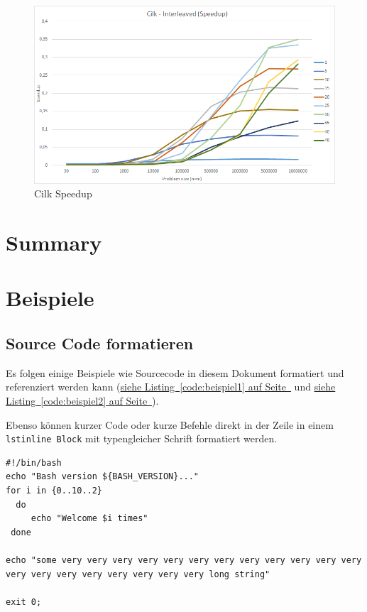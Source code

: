 \documentclass[12pt,a4paper,titlepage,oneside]{scrartcl}
\begin{document}
\begin{figure}[h]
\includegraphics[width=\linewidth]{Saturn_Cilk_Speedup}
\caption{Cilk Speedup}
\end{figure}

\section{Summary}


\section{Beispiele}
\subsection{Source Code formatieren}
Es folgen einige Beispiele wie Sourcecode in diesem Dokument formatiert und referenziert werden kann
(\hyperref[code:beispiel1]{siehe Listing~\ref*{code:beispiel1} auf Seite~\pageref*{code:beispiel1}} und \hyperref[code:beispiel2]{siehe Listing~\ref*{code:beispiel2} auf Seite~\pageref*{code:beispiel2}}).

Ebenso können kurzer Code oder kurze Befehle direkt in der Zeile in einem \lstinline{lstinline Block} mit typengleicher Schrift formatiert werden.



\begin{lstlisting}[caption=Example bash script,label=code:beispiel2,style=simple]
#!/bin/bash
echo "Bash version ${BASH_VERSION}..."
for i in {0..10..2}
  do
     echo "Welcome $i times"
 done

echo "some very very very very very very very very very very very very very very very very very very very very long string"

exit 0;
\end{lstlisting}
\end{document}
